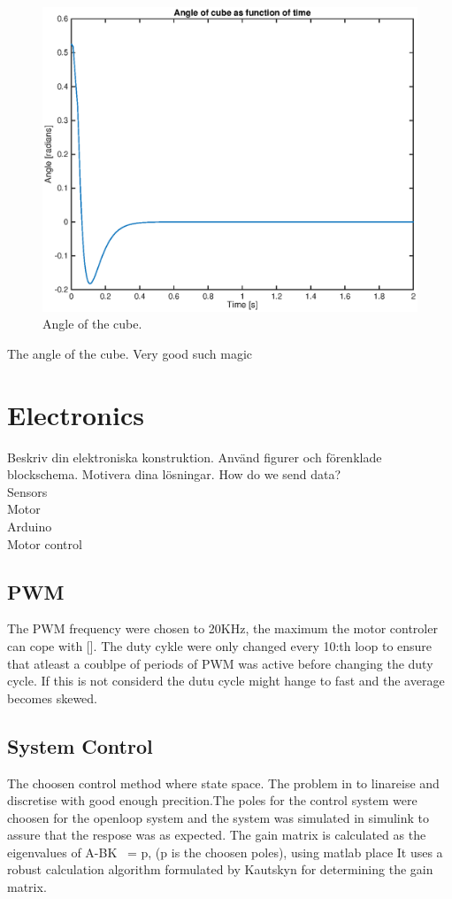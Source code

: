 \documentclass[a4paper,11pt]{kth-mag}
\begin{document}
\begin{figure}[!htb]
\centering
\includegraphics[scale=.7]{angleplot.eps}
\caption{Angle of the cube.}
\label{fig:voltageplot}
\end{figure}

The angle of the cube. Very good such magic


\section{Electronics}
Beskriv din elektroniska konstruktion. Använd figurer och förenklade blockschema. Motivera dina lösningar.
How do we send data?
\\ Sensors
\\ Motor
\\ Arduino
\\ Motor control

\subsection{PWM}
The PWM frequency were chosen to 20KHz, the maximum the motor controler can cope with [].
The duty cykle were only changed every 10:th loop to ensure that atleast a coublpe of periods of PWM was active before changing the duty cycle. If this is not considerd the dutu cycle might hange to fast and the average becomes skewed.  

\subsection{System Control}
The choosen control method where state space. The problem in to linareise and discretise with good enough precition.The poles for the control system were choosen for the openloop system and the system was simulated in 
	simulink to assure that the respose was as expected. 
	The gain matrix is calculated as the eigenvalues of A-BK ~= p, (p is the choosen poles), using matlab place
	It uses a robust calculation algorithm formulated by Kautskyn for determining the gain matrix.
\end{document}
